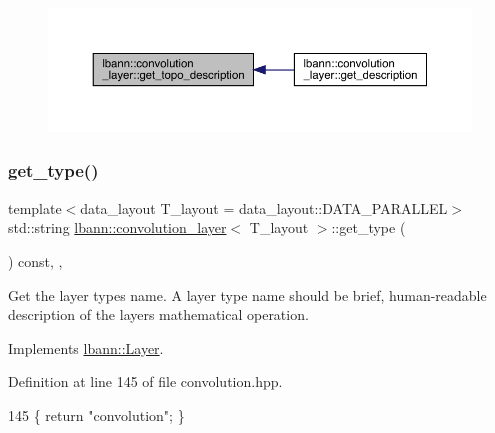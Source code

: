 \begin{figure}[H]
\begin{center}
\leavevmode
\includegraphics[width=350pt]{classlbann_1_1convolution__layer_a5af5bb8b7fb68ed4e5085be676788eed_icgraph}
\end{center}
\end{figure}
\mbox{\label{classlbann_1_1convolution__layer_ac0f341b98118f5494c95f9048bdb7a43}} 
\subsubsection{\texorpdfstring{get\+\_\+type()}{get\_type()}}
{\footnotesize\ttfamily template$<$data\+\_\+layout T\+\_\+layout = data\+\_\+layout\+::\+D\+A\+T\+A\+\_\+\+P\+A\+R\+A\+L\+L\+EL$>$ \\
std\+::string \hyperlink{classlbann_1_1convolution__layer}{lbann\+::convolution\+\_\+layer}$<$ T\+\_\+layout $>$\+::get\+\_\+type (\begin{DoxyParamCaption}{ }\end{DoxyParamCaption}) const\hspace{0.3cm}{\ttfamily [inline]}, {\ttfamily [override]}, {\ttfamily [virtual]}}

Get the layer type\textquotesingle{}s name. A layer type name should be brief, human-\/readable description of the layer\textquotesingle{}s mathematical operation. 

Implements \hyperlink{classlbann_1_1Layer_a0fa0ea9160b490c151c0a17fde4f7239}{lbann\+::\+Layer}.



Definition at line 145 of file convolution.\+hpp.


\begin{DoxyCode}
145 \{ \textcolor{keywordflow}{return} \textcolor{stringliteral}{"convolution"}; \}
\end{DoxyCode}
\mbox{\label{classlbann_1_1convolution__layer_ab20636b44d2b17abdb5424df54cb9c6d}} 

